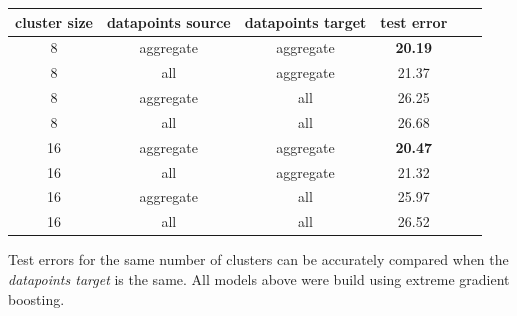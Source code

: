 \begin{table}[!ht]
	{\begin{tabular}{ | c | c | c | c | c | c | }
		\hline
		{cluster size} & {datapoints source} & {datapoints target} & {test error} \\ \hline
		8	&	aggregate 	&	aggregate 	& 	\textbf{20.19} 	\\ \hline
		8	&	all 		&	aggregate 	& 	21.37	\\ \hline \hline
		8	&	aggregate 	&	all 		& 	26.25	\\ \hline
		8	&	all			& 	all 		&	26.68	\\ \hline \hline
		16	&	aggregate	& 	aggregate 	&	\textbf{20.47}	\\ \hline
		16	&	all			& 	aggregate 	& 	21.32	\\ \hline \hline
		16	&	aggregate	& 	all 		& 	25.97	\\ \hline
		16	&	all			&	all 		&	26.52	\\ \hline \hline
	\end{tabular}}
	\label{tab:train_test_errors}
	\begin{tabnote}
		Test errors for the same number of clusters can be accurately compared when the \textit{datapoints target} is the same. All models above were build using extreme gradient boosting.
	\end{tabnote}
\end{table}
	

